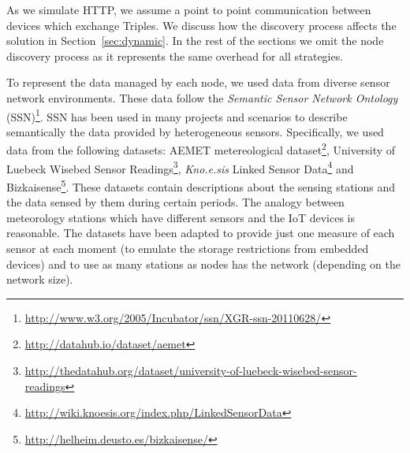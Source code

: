 As we simulate HTTP, we assume a point to point communication between devices which exchange Triples.
We discuss how the discovery process affects the solution in Section~\ref{sec:dynamic}.
In the rest of the sections we omit the node discovery process as it represents the same overhead for all strategies.


To represent the data managed by each node, we used data from diverse sensor network environments.
These data follow the \textit{Semantic Sensor Network Ontology} (SSN)\footnote{\url{http://www.w3.org/2005/Incubator/ssn/XGR-ssn-20110628/}}.
SSN has been used in many projects and scenarios to describe semantically the data provided by heterogeneous sensors.
Specifically, we used data from the following datasets:
AEMET metereological dataset\footnote{\url{http://datahub.io/dataset/aemet}},
University of Luebeck Wisebed Sensor Readings\footnote{\url{http://thedatahub.org/dataset/university-of-luebeck-wisebed-sensor-readings}},
\emph{Kno.e.sis} Linked Sensor Data\footnote{\url{http://wiki.knoesis.org/index.php/LinkedSensorData}}
and Bizkaisense\footnote{\url{http://helheim.deusto.es/bizkaisense/}}.%
These datasets contain descriptions about the sensing stations and the data sensed by them during certain periods.
The analogy between meteorology stations which have different sensors and the IoT devices is reasonable.
The datasets have been adapted to provide just one measure of each sensor at each moment (to emulate the storage restrictions from embedded devices) and to use as many stations as nodes has the network (depending on the network size).

